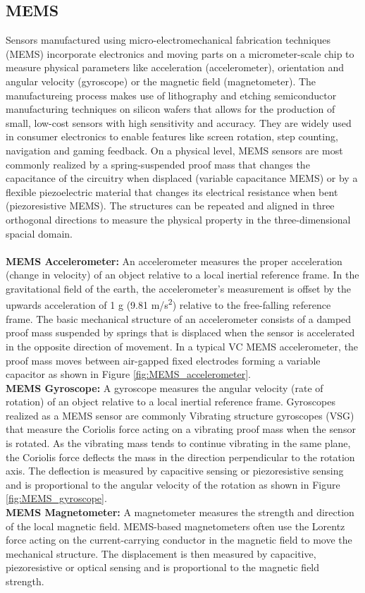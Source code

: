 \documentclass[sigconf, nonacm]{acmart}
\begin{document}
\subsection{MEMS}

Sensors manufactured using micro-electromechanical fabrication techniques (MEMS) incorporate electronics and moving parts on a micrometer-scale chip to measure physical parameters like acceleration (accelerometer), orientation and angular velocity (gyroscope) or the magnetic field (magnetometer).
The manufactureing process makes use of lithography and etching semiconductor manufacturing techniques on silicon wafers that allows for the production of small, low-cost sensors with high sensitivity and accuracy.
They are widely used in consumer electronics to enable features like screen rotation, step counting, navigation and gaming feedback.
On a physical level, MEMS sensors are most commonly realized by a spring-suspended proof mass that changes the capacitance of the circuitry when displaced (variable capacitance MEMS) or by a flexible piezoelectric material that changes its electrical resistance when bent (piezoresistive MEMS).
The structures can be repeated and aligned in three orthogonal directions to measure the physical property in the three-dimensional spacial domain.
\\~\\
\textbf{MEMS Accelerometer:} An accelerometer measures the proper acceleration (change in velocity) of an object relative to a local inertial reference frame.
In the gravitational field of the earth, the accelerometer's measurement is offset by the upwards acceleration of 1 g (9.81 m/s\textsuperscript{2}) relative to the free-falling reference frame.
The basic mechanical structure of an accelerometer consists of a damped proof mass suspended by springs that is displaced when the sensor is accelerated in the opposite direction of movement.
In a typical VC MEMS accelerometer, the proof mass moves between air-gapped fixed electrodes forming a variable capacitor as shown in Figure \ref{fig:MEMS_accelerometer}.
\\[6pt]
\textbf{MEMS Gyroscope:} A gyroscope measures the angular velocity (rate of rotation) of an object relative to a local inertial reference frame.
Gyroscopes realized as a MEMS sensor are commonly Vibrating structure gyroscopes (VSG) that measure the Coriolis force acting on a vibrating proof mass when the sensor is rotated.
As the vibrating mass tends to continue vibrating in the same plane, the Coriolis force deflects the mass in the direction perpendicular to the rotation axis.
The deflection is measured by capacitive sensing or piezoresistive sensing and is proportional to the angular velocity of the rotation as shown in Figure \ref{fig:MEMS_gyroscope}.
\\[6pt]
\textbf{MEMS Magnetometer:} A magnetometer measures the strength and direction of the local magnetic field.
MEMS-based magnetometers often use the Lorentz force acting on the current-carrying conductor in the magnetic field to move the mechanical structure.
The displacement is then measured by capacitive, piezoresistive or optical sensing and is proportional to the magnetic field strength.
\end{document}
